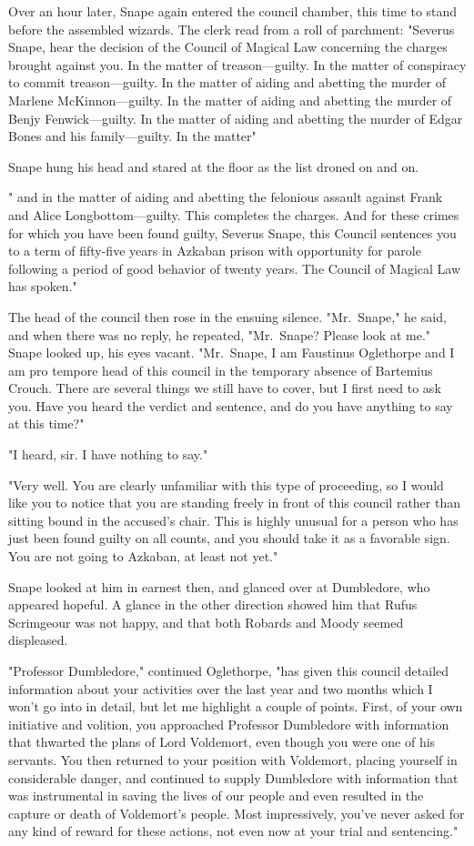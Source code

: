 Over an hour later, Snape again entered the council chamber, this time to stand before the assembled wizards. The clerk read from a roll of parchment: "Severus Snape, hear the decision of the Council of Magical Law concerning the charges brought against you. In the matter of treason—guilty. In the matter of conspiracy to commit treason—guilty. In the matter of aiding and abetting the murder of Marlene McKinnon—guilty. In the matter of aiding and abetting the murder of Benjy Fenwick—guilty. In the matter of aiding and abetting the murder of Edgar Bones and his family—guilty. In the matter{\el}"

Snape hung his head and stared at the floor as the list droned on and on.

"{\el} and in the matter of aiding and abetting the felonious assault against Frank and Alice Longbottom—guilty. This completes the charges. And for these crimes for which you have been found guilty, Severus Snape, this Council sentences you to a term of fifty-five years in Azkaban prison with opportunity for parole following a period of good behavior of twenty years. The Council of Magical Law has spoken."

The head of the council then rose in the ensuing silence. "Mr.~Snape," he said, and when there was no reply, he repeated, "Mr.~Snape? Please look at me." Snape looked up, his eyes vacant. "Mr.~Snape, I am Faustinus Oglethorpe and I am pro tempore head of this council in the temporary absence of Bartemius Crouch. There are several things we still have to cover, but I first need to ask you. Have you heard the verdict and sentence, and do you have anything to say at this time?"

"I heard, sir. I have nothing to say."

"Very well. You are clearly unfamiliar with this type of proceeding, so I would like you to notice that you are standing freely in front of this council rather than sitting bound in the accused's chair. This is highly unusual for a person who has just been found guilty on all counts, and you should take it as a favorable sign. You are not going to Azkaban, at least not yet."

Snape looked at him in earnest then, and glanced over at Dumbledore, who appeared hopeful. A glance in the other direction showed him that Rufus Scrimgeour was not happy, and that both Robards and Moody seemed displeased.

"Professor Dumbledore," continued Oglethorpe, "has given this council detailed information about your activities over the last year and two months which I won't go into in detail, but let me highlight a couple of points. First, of your own initiative and volition, you approached Professor Dumbledore with information that thwarted the plans of Lord Voldemort, even though you were one of his servants. You then returned to your position with Voldemort, placing yourself in considerable danger, and continued to supply Dumbledore with information that was instrumental in saving the lives of our people and even resulted in the capture or death of Voldemort's people. Most impressively, you've never asked for any kind of reward for these actions, not even now at your trial and sentencing."

